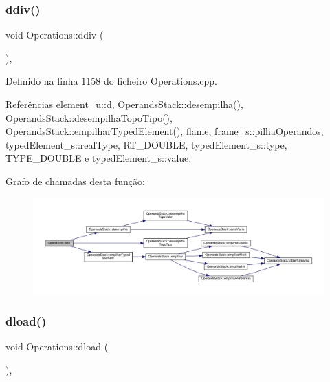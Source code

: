 \subsubsection{\texorpdfstring{ddiv()}{ddiv()}}
{\footnotesize\ttfamily void Operations\+::ddiv (\begin{DoxyParamCaption}{ }\end{DoxyParamCaption})\hspace{0.3cm}{\ttfamily [static]}, {\ttfamily [private]}}



Definido na linha 1158 do ficheiro Operations.\+cpp.



Referências element\+\_\+u\+::d, Operands\+Stack\+::desempilha(), Operands\+Stack\+::desempilha\+Topo\+Tipo(), Operands\+Stack\+::empilhar\+Typed\+Element(), flame, frame\+\_\+s\+::pilha\+Operandos, typed\+Element\+\_\+s\+::real\+Type, R\+T\+\_\+\+D\+O\+U\+B\+LE, typed\+Element\+\_\+s\+::type, T\+Y\+P\+E\+\_\+\+D\+O\+U\+B\+LE e typed\+Element\+\_\+s\+::value.

Grafo de chamadas desta função\+:
\nopagebreak
\begin{figure}[H]
\begin{center}
\leavevmode
\includegraphics[width=350pt]{classOperations_a3c323c9f0d40e68bf54cd449a55618c3_cgraph}
\end{center}
\end{figure}
\mbox{\label{classOperations_af53b0b32da7737741c20b4e313eaac84}} 
\subsubsection{\texorpdfstring{dload()}{dload()}}
{\footnotesize\ttfamily void Operations\+::dload (\begin{DoxyParamCaption}{ }\end{DoxyParamCaption})\hspace{0.3cm}{\ttfamily [static]}, {\ttfamily [private]}}



